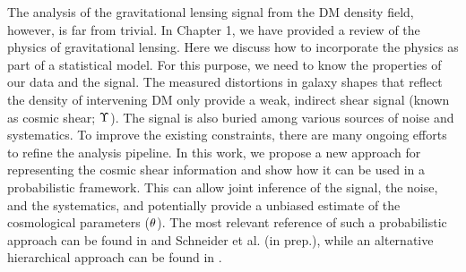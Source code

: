 The analysis of the gravitational lensing signal from the DM density field, 
however, is far from trivial. 
In Chapter 1, we have provided a review of the physics of gravitational lensing. 
Here we discuss how to incorporate the physics as part of a statistical model. 
For this purpose, we need to know the properties of our data and the signal.
The measured distortions in galaxy shapes that reflect the density of intervening DM 
only provide a weak, indirect shear signal (known as cosmic
shear; $\Upsilon$). The signal is also buried among various sources of noise
and systematics. 
To improve the existing constraints, there are many ongoing 
efforts to refine the analysis pipeline. 
In this work, we propose a new approach for representing 
the cosmic shear information and show how it can be used in a probabilistic framework. 
This can allow joint inference of the signal, the noise, and the systematics, 
and potentially provide a unbiased estimate of the cosmological parameters 
(${\bf \theta}$). 
The most relevant reference of such a probabilistic approach can be found in 
\cite{Schneider2014} and Schneider et al. (in prep.), 
while an alternative hierarchical approach can be found in \cite{Alsing2015}. 

